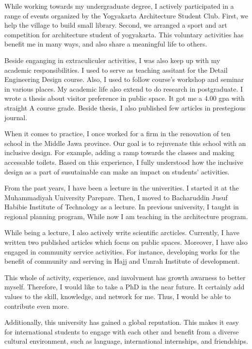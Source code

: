 \documentclass[../main.tex]{subfiles}
\begin{document}
While working towards my undergraduate degree, I actively participated in a range of events organized by the Yogyakarta Architecture Student Club.
First, we help the village to build small library.
Second, we arranged a sport and art competition for architecture student of yogyakarta.
This voluntary activities has benefit me in many ways, and also share a meaningful life to others.

Beside enganging in extraculiculer activities, I was also keep up with my academic responsibilities.
I used to serve as teaching assitant for the Detail Engineering Design course.
Also, I used to follow course's workshop and seminar in various places.
My academic life also extend to do research in postgraduate.
I wrote a thesis about visitor preference in public space.
It got me a 4.00 gpa with straight A course grade. Beside thesis, I also published few articles in prestegious journal.

When it comes to practice, I once worked for a firm in the renovation of ten school in the Middle Jawa province.
Our goal is to rejuvenate this school with an inclusive design.
For example, adding a ramp towards the classes and making accessable toilets.
Based on this experience, I fully understood how the inclusive design as a part of susutainable can make an impact on students' activities.

From the past years, I have been a lecture in the univerities.
I started it at the Muhammadiyah University Parepare.
Then, I moved to Bacharuddin Jusuf Habibie Institute of Technology as a  lecture. In previous university, I taught in regional planning program, While now I am teaching in the architecture program.

While being a lecture, I also actively write scientific arcticles. Currently, I have written two published articles which focus on public spaces.
Moreover, I have also engaged in community service activities.
For instance, developing works for the benefit of community and serving in Hajj and Umrah Institute of development.

This whole of activity, experience, and involvment has growth awarness to better myself. Therefore, I would like to take a PhD in the near future.
It certainly add values to the skill, knowledge, and network for me.
Thus, I would be able to contribute even more.


Additionally, this university has gained a global reputation. This makes it easy for international students to engage with each other and benefit from a diverse cultural environment, such as language, international internships, and friendships.
\end{document}
